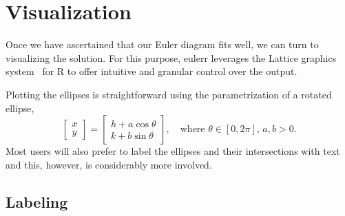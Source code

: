 \documentclass[
  oneside,
  openany,
  numbers=noendperiod,
  parskip=half,
  bibliography=totoc
]{scrbook}\usepackage[]{graphicx}\usepackage{xcolor}
\newcommand{\pkg}[1]{{\fontseries{b}\selectfont #1}}
\begin{document}
\chapter{Visualization}
\label{ap:visualization}

Once we have ascertained that our Euler diagram fits well, we can turn to
visualizing the solution. For this purpose, \pkg{eulerr} leverages the
\pkg{Lattice} graphics system~\citep{Sarkar_2008} for R to offer intuitive and
granular control over the output.

Plotting the ellipses is straightforward using the parametrization of a rotated
ellipse,
%
\begin{equation*}
\begin{bmatrix}
  x \\ y
\end{bmatrix} =
\begin{bmatrix}
  h + a \cos{\theta} \\
  k + b \sin{\theta}
\end{bmatrix},\quad \text{where } \theta \in [0, 2\pi],\, a,b>0.
\end{equation*}
%
Most users will also prefer to label the ellipses and their intersections
with text and this, however, is considerably more involved.

\section{Labeling}
\label{sec:labeling}
\end{document}
